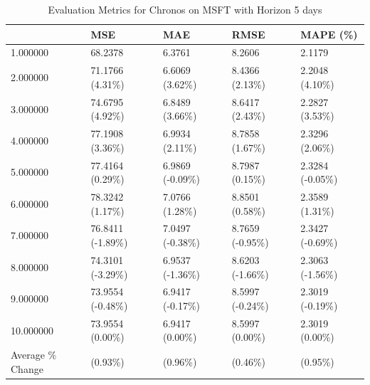 \begin{table}
\caption{Evaluation Metrics for Chronos on MSFT with Horizon 5 days}
\label{tab:chronos_base_MSFT_h5_metrics}
\begin{tabular}{lllll}
\toprule
 & MSE & MAE & RMSE & MAPE (\%) \\
\midrule
1.000000 & 68.2378 & 6.3761 & 8.2606 & 2.1179 \\
2.000000 & 71.1766 (4.31\%) & 6.6069 (3.62\%) & 8.4366 (2.13\%) & 2.2048 (4.10\%) \\
3.000000 & 74.6795 (4.92\%) & 6.8489 (3.66\%) & 8.6417 (2.43\%) & 2.2827 (3.53\%) \\
4.000000 & 77.1908 (3.36\%) & 6.9934 (2.11\%) & 8.7858 (1.67\%) & 2.3296 (2.06\%) \\
5.000000 & 77.4164 (0.29\%) & 6.9869 (-0.09\%) & 8.7987 (0.15\%) & 2.3284 (-0.05\%) \\
6.000000 & 78.3242 (1.17\%) & 7.0766 (1.28\%) & 8.8501 (0.58\%) & 2.3589 (1.31\%) \\
7.000000 & 76.8411 (-1.89\%) & 7.0497 (-0.38\%) & 8.7659 (-0.95\%) & 2.3427 (-0.69\%) \\
8.000000 & 74.3101 (-3.29\%) & 6.9537 (-1.36\%) & 8.6203 (-1.66\%) & 2.3063 (-1.56\%) \\
9.000000 & 73.9554 (-0.48\%) & 6.9417 (-0.17\%) & 8.5997 (-0.24\%) & 2.3019 (-0.19\%) \\
10.000000 & 73.9554 (0.00\%) & 6.9417 (0.00\%) & 8.5997 (0.00\%) & 2.3019 (0.00\%) \\
Average \% Change & (0.93\%) & (0.96\%) & (0.46\%) & (0.95\%) \\
\bottomrule
\end{tabular}
\end{table}
